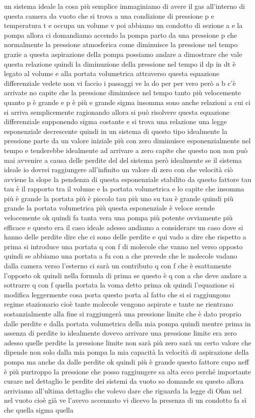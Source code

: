 un sistema ideale la cosa più semplice immaginiamo di avere il gas all'interno di questa camera da vuoto che si trova a una condizione di pressione p e temperatura t e occupa un volume v poi abbiamo un condotto di sezione a e la pompa allora ci domandiamo accendo la pompa parto da una pressione p che normalmente la pressione atmosferica come diminuisce la pressione nel tempo grazie a questa aspirazione della pompa possiamo andare a dimostrare che vale questa relazione quindi la diminuzione della pressione nel tempo il dp in dt è legato al volume e alla portata volumetrica attraverso questa equazione differenziale vedete non vi faccio i passaggi ve la do per per vero però a b c'è arrivate no capite che la pressione diminuisce nel tempo tanto più velocemente quanto p è grande e p è più e grande sigma insomma sono anche relazioni a cui ci si arriva semplicemente ragionando allora si può risolvere questa equazione differenziale supponendo sigma costante e si trova una relazione una legge esponenziale decrescente quindi in un sistema di questo tipo idealmente la pressione parte da un valore iniziale più con zero diminuisce esponenzialmente nel tempo e tenderebbe idealmente ad arrivare a zero capite che questo non non può mai avvenire a causa delle perdite del del sistema però idealmente se il sistema ideale io dovrei raggiungere all'infinito un valore di zero con che velocità ciò avviene la slope la pendenza di questa esponenziale stabilito da questo fattore tau tau è il rapporto tra il volume e la portata volumetrica e lo capite che insomma più è grande la portata più è piccolo tau più uno su tau è grande quindi più grande la portata volumetrica più questa esponenziale è veloce scende velocemente ok quindi fa tanta vera una pompa più potente ovviamente più efficace e questo era il caso ideale adesso andiamo a considerare un caso dove si hanno delle perdite dire che ci sono delle perdite e qui vado a dire che rispetto a prima si introduce una portata q con f di molecole che vanno nel verso opposto quindi se abbiamo una portata a fu con a che prevede che le molecole vadano dalla camera verso l'esterno ci sarà un contributo q con f che è esattamente l'opposto ok quindi nella formula di prima se questo è q con a che deve andare a sottrarre q con f quella portata la voma detto prima ok quindi l'equazione si modifica leggermente cosa porta questo porta al fatto che si si raggiungono regime stazionario cioè tante molecole vengono aspirate e tante ne rientrano sostanzialmente alla fine si raggiungerà una pressione limite che è dato proprio dalle perdite e dalla portata volumetrica della mia pompa quindi mentre prima in assenza di perdite io idealmente dovevo arrivare una pressione limite era zero adesso quelle perdite la pressione limite non sarà più zero sarà un certo valore che dipende non solo dalla mia pompa la mia capacità la velocità di aspirazione della pompa ma anche da dalle perdite ok quindi più è grande questo fattore cupo neff è più purtroppo la pressione che posso raggiungere sa alta ecco perché importante curare nel dettaglio le perdite dei sistemi da vuoto so domande su questo allora arriviamo all'ultima dettaglio che volevo dare che riguarda la legge di Ohm nel nel vuoto cioè già ve l'avevo accennato vi dicevo la presenza di un condotto fa sì che quella sigma quella 